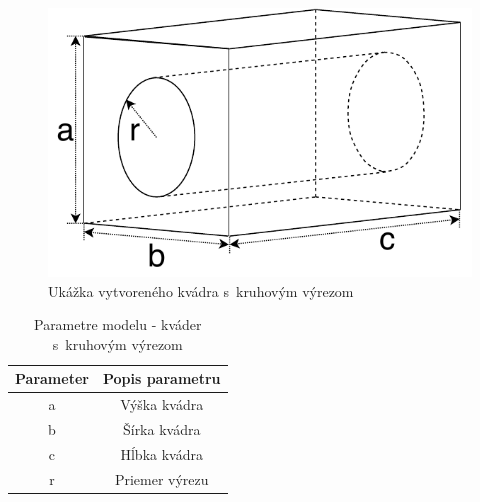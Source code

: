 \begin{minipage}[b]{\textwidth}
\begin{minipage}[b]{0.49\textwidth}
\begin{figure}[H]
	\centering
	\includegraphics[height=0.49\textwidth]{obrazky-figures/Examples/A4.pdf}
	\caption{Ukážka vytvoreného kvádra s~kruhovým výrezom}
	\label{fig:A4First}
\end{figure}
\end{minipage}
\begin{minipage}[b]{0.49\textwidth}
\begin{table}[H]
\centering
\begin{tabular}{ |c|c| }
 \hline
 Parameter & Popis parametru \\
 \hline
 \hline
 a & Výška kvádra\\ 
  \hline
 b & Šírka kvádra \\  
  \hline
 c & Hĺbka kvádra \\  
  \hline
 r & Priemer výrezu  \\
  \hline
\end{tabular}
\caption{Parametre modelu - kváder s~kruhovým výrezom}
 \label{tab:blockWithCircleHole}
\end{table}

\end{minipage}
\end{minipage}


